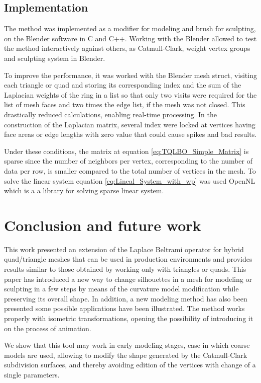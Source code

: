 \documentclass[10pt, conference]{IEEEtran}
\begin{document}
\subsection{Implementation\label{sub:Implementation}}

The method was implemented as a modifier for modeling and brush for
sculpting, on the Blender software \cite{blender} in C and C++. Working
with the Blender allowed to test the method interactively against
others, as Catmull-Clark, weight vertex groups and sculpting system
in Blender.

To improve the performance, it was worked with the Blender mesh struct,
visiting each triangle or quad and storing its corresponding index
and the sum of the Laplacian weights of the ring in a list so that
only two visits were required for the list of mesh faces and two times
the edge list, if the mesh was not closed. This drastically reduced
calculations, enabling real-time processing. In the construction of
the Laplacian matrix, several index were locked at vertices having
face areas or edge lengths with zero value that could cause spikes
and bad results.

Under these conditions, the matrix at equation \ref{eq:TQLBO_Simple_Matrix}
is sparse since the number of neighbors per vertex, corresponding
to the number of data per row, is smaller compared to the total number
of vertices in the mesh. To solve the linear system equation \ref{eq:Lineal_System_with_wp}
was used OpenNL which is a a library for solving sparse linear system.


\section{Conclusion and future work\label{sec:Conclusion-and-future}}

This work presented an extension of the Laplace Beltrami operator
for hybrid quad/triangle meshes that can be used in production environments
and provides results similar to those obtained by working only with
triangles or quads. This paper has introduced a new way to change
silhouettes in a mesh for modeling or sculpting in a few steps by
means of the curvature model modification while preserving its overall
shape. In addition, a new modeling method has also been presented
some possible applications have been illustrated. The method works
properly with isometric transformations, opening the possibility of
introducing it on the process of animation.

We show that this tool may work in early modeling stages, case in
which coarse models are used, allowing to modify the shape generated
by the Catmull-Clark subdivision surfaces, and thereby avoiding edition
of the vertices with change of a single parameters.
\end{document}
